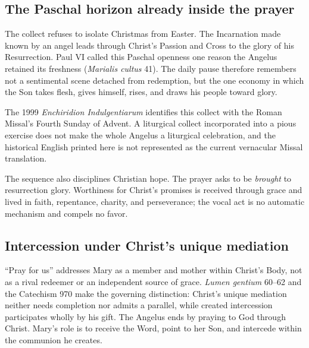 \subsection{The Paschal horizon already inside the prayer}

The collect refuses to isolate Christmas from Easter. The Incarnation made known by an angel leads through Christ's Passion and Cross to the glory of his Resurrection. Paul VI called this Paschal openness one reason the Angelus retained its freshness (\textit{Marialis cultus} 41). The daily pause therefore remembers not a sentimental scene detached from redemption, but the one economy in which the Son takes flesh, gives himself, rises, and draws his people toward glory.

The 1999 \textit{Enchiridion Indulgentiarum} identifies this collect with the Roman Missal's Fourth Sunday of Advent. A liturgical collect incorporated into a pious exercise does not make the whole Angelus a liturgical celebration, and the historical English printed here is not represented as the current vernacular Missal translation.

The sequence also disciplines Christian hope. The prayer asks to be \emph{brought} to resurrection glory. Worthiness for Christ's promises is received through grace and lived in faith, repentance, charity, and perseverance; the vocal act is no automatic mechanism and compels no favor.

\subsection{Intercession under Christ's unique mediation}

``Pray for us'' addresses Mary as a member and mother within Christ's Body, not as a rival redeemer or an independent source of grace. \textit{Lumen gentium} 60--62 and the Catechism 970 make the governing distinction: Christ's unique mediation neither needs completion nor admits a parallel, while created intercession participates wholly by his gift. The Angelus ends by praying to God through Christ. Mary's role is to receive the Word, point to her Son, and intercede within the communion he creates.
